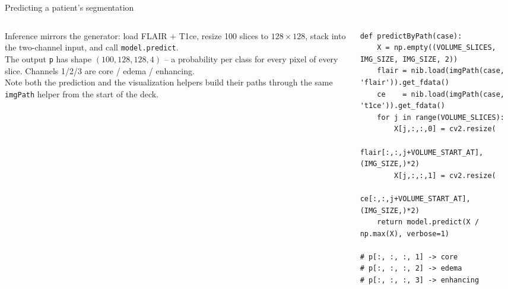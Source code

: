 \documentclass[10pt,aspectratio=169]{beamer}
\begin{document}
\begin{frame}[fragile]{Predicting a patient's segmentation}
\begin{columns}[T,onlytextwidth]
\begin{column}{0.42\textwidth}
\small
Inference mirrors the generator: load FLAIR + T1ce, resize 100 slices to $128\times128$, stack into
the two-channel input, and call \texttt{model.predict}.\\[0.4em]
The output \texttt{p} has shape $(100, 128, 128, 4)$ -- a probability per class for every pixel of
every slice. Channels 1/2/3 are core / edema / enhancing.\\[0.4em]
Note both the prediction and the visualization helpers build their paths through the same
\texttt{imgPath} helper from the start of the deck.
\end{column}
\begin{column}{0.56\textwidth}
\begin{lstlisting}[firstnumber=last]
def predictByPath(case):
    X = np.empty((VOLUME_SLICES, IMG_SIZE, IMG_SIZE, 2))
    flair = nib.load(imgPath(case, 'flair')).get_fdata()
    ce    = nib.load(imgPath(case, 't1ce')).get_fdata()
    for j in range(VOLUME_SLICES):
        X[j,:,:,0] = cv2.resize(
            flair[:,:,j+VOLUME_START_AT], (IMG_SIZE,)*2)
        X[j,:,:,1] = cv2.resize(
            ce[:,:,j+VOLUME_START_AT], (IMG_SIZE,)*2)
    return model.predict(X / np.max(X), verbose=1)

# p[:, :, :, 1] -> core
# p[:, :, :, 2] -> edema
# p[:, :, :, 3] -> enhancing
\end{lstlisting}
\end{column}
\end{columns}
\end{frame}
\end{document}
